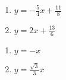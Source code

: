 \begin{multicols}{2}
\begin{enumerate}
\setcounter{enumi}{\value{HW}}

\item $y = -\frac{5}{4} x + \frac{11}{8}$ 
\item $y = 2x + \frac{13}{6}$ 

\setcounter{HW}{\value{enumi}}
\end{enumerate}
\end{multicols}

\begin{multicols}{2}
\begin{enumerate}
\setcounter{enumi}{\value{HW}}

\item $y = -x$
\item $y = \frac{\sqrt{3}}{3} x$

\setcounter{HW}{\value{enumi}}
\end{enumerate}
\end{multicols}


